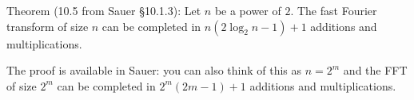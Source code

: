\documentclass[12pt,letterpaper,noanswers]{exam}
\newcommand{\vc}[1]{\boldsymbol{#1}}
\begin{document}
\begin{tcolorbox}
Theorem (10.5 from Sauer \S 10.1.3): Let $n$ be a power of $2$.  The fast Fourier transform of size $n$ can be completed in $n(2\log_2 n-1)+1$ additions and multiplications.
\vspace{0.1cm}

The proof is available in Sauer: you can also think of this as $n = 2^m$ and the FFT of size $2^m$ can be completed in $2^m(2m-1)+1$ additions and multiplications.


\end{tcolorbox}



\end{document}
